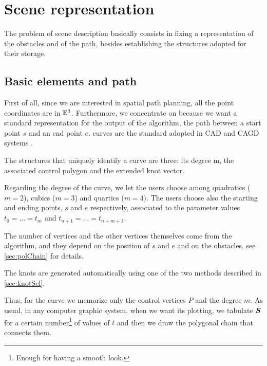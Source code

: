 \documentclass[dissertation.tex]{subfiles}
\begin{document}
\chapter{Scene representation}\label{cha:scene}
The problem of scene description basically consists in fixing a
representation of the obstacles and of the path, besides establishing the structures adopted for their storage.

\section{Basic elements and path}
First of all, since we are interested in spatial path planning, all
the point coordinates are in $\mathbb{E}^3$. Furthermore, we concentrate
on \bss because we want a standard representation for the output of
the algorithm, the path between a start point $s$ and an end point
$e$. \bs
curves are the standard adopted in \ac{CAD} and
\ac{CAGD} systems \cite{hughes}\cite{foley}. 

The structures that uniquely identify a \bs curve are
three: its degree m, the associated control polygon and the extended
knot vector.

Regarding the degree of the curve, we let 
the users choose among quadratics
($m=2$), cubics ($m=3$) and quartics ($m=4$). The users
choose also the starting and ending points, $s$ and $e$ respectively,
associated to the parameter values $t_0=\dots=t_m$ and
$t_{n+1}=\dots=t_{n+m+1}$.

The number
of vertices and the other vertices themselves come from the algorithm,
and they depend on the position of $s$ and $e$ and on the obstacles, see
\cref{sec:polChain} for details.

The knots are generated automatically using one of the two methods
described in \cref{sec:knotSel}.

Thus, for the curve we memorize only the control vertices $P$ and the
degree 
$m$. As usual, in any computer graphic system, when we want its plotting, we tabulate $\boldsymbol{S}$ for a certain
number\footnote{Enough for having a smooth look.} of values of $t$ and
then we draw the polygonal chain that connects them.
\end{document}
